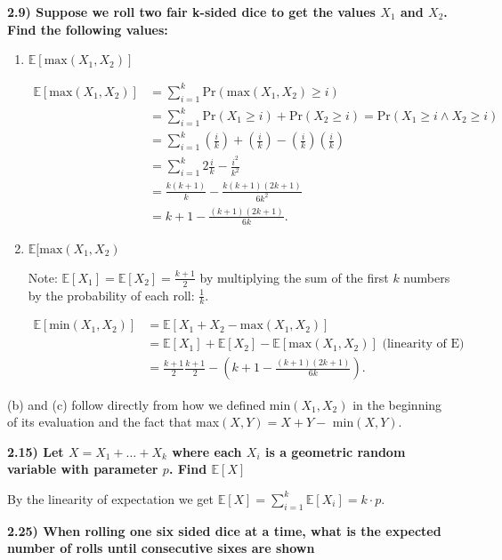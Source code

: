 \documentclass[letterpaper, 12pt]{article}
\begin{document}
	\noindent\textbf{2.9) Suppose we roll two fair k-sided dice to get the values $X_1$ and $X_2$. Find the following values:}
	\begin{enumerate}
		\item $\mathbb{E}[\text{max}(X_1,X_2)]$

			\begin{align*}
				\mathbb{E}[\text{max}(X_1,X_2)] &= \sum_{i=1}^{k}\text{Pr}(\text{max}(X_1,X_2)\geq i) \\
				&= \sum_{i=1}^k \text{Pr}(X_1 \geq i) + \text{Pr}(X_2 \geq i) = \text{Pr}(X_1 \geq i \land X_2\geq i) \\
				&= \sum_{i=1}^k (\frac{i}{k}) + (\frac{i}{k}) - (\frac{i}{k})(\frac{i}{k}) \\
				&= \sum_{i=1}^k 2\frac{i}{k} - \frac{i^2}{k^2} \\
				&= \frac{k(k+1)}{k} - \frac{k(k+1)(2k+1)}{6k^2} \\
				&= k+1 - \frac{(k+1)(2k+1)}{6k}.
			\end{align*}

		\item $\mathbb{E}[\text{max}(X_1,X_2)$
	

			Note: $\mathbb{E}[X_1] = \mathbb{E}[X_2] = \frac{k+1}{2}$ by multiplying the sum of the first $k$ numbers by the probability of each roll: $\frac{1}{k}$.

			\begin{align*}
				\mathbb{E}[\text{min}(X_1,X_2)] &= \mathbb{E}[X_1 + X_2 - \text{max}(X_1,X_2)] \\
				&= \mathbb{E}[X_1] + \mathbb{E}[X_2] - \mathbb{E}[\text{max}(X_1,X_2)] \text{ (linearity of E)}\\
				&= \frac{k+1}{2} \frac{k+1}{2} - (k+1 - \frac{(k+1)(2k+1)}{6k}).
			\end{align*}

	\end{enumerate}

	(b) and (c) follow directly from how we defined min$(X_1, X_2)$ in the beginning of its evaluation and the fact that max$(X,Y) = X + Y -$ min$(X,Y)$.

	\noindent\textbf{2.15) Let $X = X_1 + \dots + X_k$ where each $X_i$ is a geometric random variable with parameter $p$. Find $\mathbb{E}[X]$ }

	By the linearity of expectation we get $\mathbb{E}[X] = \sum_{i=1}^k\mathbb{E}[X_i] = k\cdot p$.

	\noindent\textbf{2.25) When rolling one six sided dice at a time, what is the expected number of rolls until consecutive sixes are shown}
	
\end{document}
